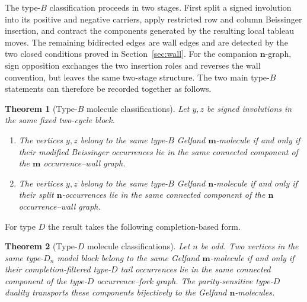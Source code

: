 \documentclass[11pt]{article}
\newtheorem{theorem}{Theorem}[section]
\theoremstyle{definition}
\theoremstyle{remark}
\newcommand{\mgraph}{\mathbf m}
\newcommand{\ngraph}{\mathbf n}
\begin{document}
The type-$B$ classification proceeds in two stages.  First split a signed
involution into its positive and negative carriers, apply restricted row
and column Beissinger insertion, and contract the components generated by
the resulting local tableau moves.  The remaining bidirected edges are
wall edges and are detected by the two closed conditions proved in
Section~\ref{sec:wall}.  For the companion $\ngraph$-graph, sign opposition
exchanges the two insertion roles and reverses the wall convention, but
leaves the same two-stage structure.  The two main type-$B$ statements can
therefore be recorded together as follows.

\begingroup
\renewcommand{\thetheorem}{\ref{thm:classification} and
\ref{thm:n-classification}}
\begin{theorem}[Type-$B$ molecule classifications]
Let $y,z$ be signed involutions in the same fixed two-cycle block.
\begin{enumerate}[label=\textup{(\alph*)}]
\item The vertices $y,z$ belong to the same type-$B$ Gelfand
$\mgraph$-molecule if and only if their modified Beissinger occurrences
lie in the same connected component of the $\mgraph$ occurrence--wall graph.
\item The vertices $y,z$ belong to the same type-$B$ Gelfand
$\ngraph$-molecule if and only if their split $\ngraph$-occurrences lie in
the same connected component of the $\ngraph$ occurrence--wall graph.
\end{enumerate}
\end{theorem}
\endgroup

For type $D$ the result takes the following completion-based form.

\begingroup
\renewcommand{\thetheorem}{\ref{thm:D-classification}}
\begin{theorem}[Type-$D$ molecule classifications]
Let $n$ be odd.  Two vertices in the same type-$D_n$ model block belong to
the same Gelfand $\mgraph$-molecule if and only if their
completion-filtered type-$D$ tail occurrences lie in the same connected
component of the
type-$D$ occurrence--fork graph.  The parity-sensitive type-$D$ duality
transports these components bijectively to the Gelfand
$\ngraph$-molecules.
\end{theorem}
\endgroup

\end{document}
